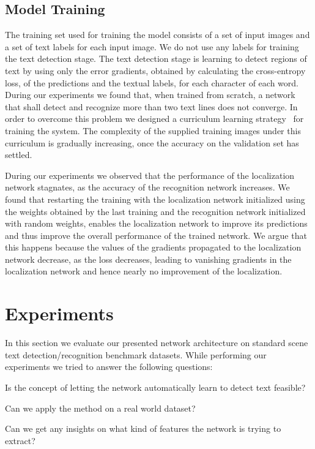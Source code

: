 \documentclass[letterpaper]{article}
\begin{document}
	\subsection{Model Training}

	The training set  used for training the model consists of a set of input images  and a set of text labels  for each input image.
	We do not use any labels for training the text detection stage.
	The text detection stage is learning to detect regions of text by using only the error gradients, obtained by calculating the cross-entropy loss, of the predictions and the textual labels, for each character of each word.
	During our experiments we found that, when trained from scratch, a network that shall detect and recognize more than two text lines does not converge.
	In order to overcome this problem we designed a curriculum learning strategy~\cite{Bengio2009Curriculum} for training the system.
	The complexity of the supplied training images under this curriculum is gradually increasing, once the accuracy on the validation set has settled.

	During our experiments we observed that the performance of the localization network stagnates, as the accuracy of the recognition network increases.
	We found that restarting the training with the localization network initialized using the weights obtained by the last training and the recognition network initialized with random weights, enables the localization network to improve its predictions and thus improve the overall performance of the trained network.
	We argue that this happens because the values of the gradients propagated to the localization network decrease, as the loss decreases, leading to vanishing gradients in the localization network and hence nearly no improvement of the localization.

	\section{Experiments}
	\label{sec:experiments}

	In this section we evaluate our presented network architecture on standard scene text detection/recognition benchmark datasets.
	While performing our experiments we tried to answer the following questions:
	\begin{enumerate*}[label={(\arabic*)}]
		\item Is the concept of letting the network automatically learn to detect text feasible?
		\item Can we apply the method on a real world dataset?
		\item Can we get any insights on what kind of features the network is trying to extract?
	\end{enumerate*}
\end{document}
